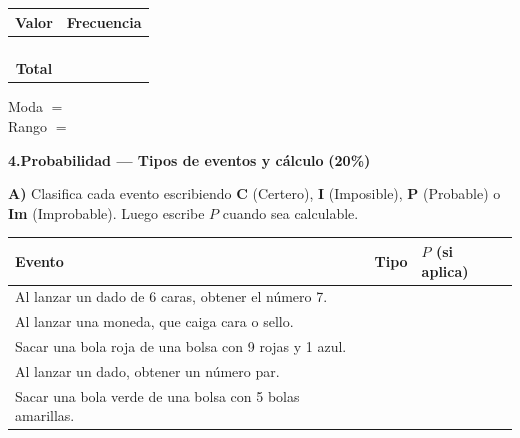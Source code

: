 \documentclass[12pt, letterpaper]{article}
\newcommand{\boxfill}[1][1.5cm]{\tcbox[on line, size=minimal,
	colframe=valdark!60, colback=boxbg, boxrule=0.8pt, arc=1mm,
	boxsep=3pt, left=2pt, right=2pt, top=2pt, bottom=2pt]%
	{\makebox[#1]{\vphantom{M}}}}
\begin{document}
	\begin{tcolorbox}[colback=white, colframe=valdark!40, boxrule=0.5pt, arc=1mm]
		\renewcommand{\arraystretch}{1.6}
		\begin{tabular}{|c|c|}
			\hline
			\rowcolor{boxbg}
			\textbf{Valor} & \textbf{Frecuencia} \\
			\hline
			\boxfill[2cm] & \boxfill[2cm] \\
			\hline
			\boxfill[2cm] & \boxfill[2cm] \\
			\hline
			\boxfill[2cm] & \boxfill[2cm] \\
			\hline
			\boxfill[2cm] & \boxfill[2cm] \\
			\hline
			\rowcolor{boxbg}\textbf{Total} & \boxfill[2cm] \\
			\hline
		\end{tabular}
		\hfill
		\begin{minipage}{0.38\textwidth}
			Moda $=$ \boxfill[2.5cm]\\[0.5cm]
			Rango $=$ \boxfill[2.5cm]
		\end{minipage}
	\end{tcolorbox}
	
	\newpage
	
	\noindent\textbf{4.\;Probabilidad — Tipos de eventos y cálculo}
	\hfill\textbf{(20\%)}
	
	\vspace{0.3cm}
	\textbf{A)} Clasifica cada evento escribiendo \textbf{C} (Certero),
	\textbf{I} (Imposible), \textbf{P} (Probable) o \textbf{Im} (Improbable).
	Luego escribe $P$ cuando sea calculable.
	
	\vspace{0.2cm}
	\renewcommand{\arraystretch}{1.8}
	\begin{center}
		\begin{tabular}{|m{9cm}|m{1.5cm}|m{2.5cm}|}
			\hline
			\rowcolor{valblue!20}
			\textbf{Evento} & \textbf{Tipo} & \textbf{$P$ (si aplica)} \\
			\hline
			Al lanzar un dado de 6 caras, obtener el número 7. &
			\boxfill[1.2cm] & \boxfill[2.2cm] \\
			\hline
			Al lanzar una moneda, que caiga cara o sello. &
			\boxfill[1.2cm] & \boxfill[2.2cm] \\
			\hline
			Sacar una bola roja de una bolsa con 9 rojas y 1 azul. &
			\boxfill[1.2cm] & \boxfill[2.2cm] \\
			\hline
			Al lanzar un dado, obtener un número par. &
			\boxfill[1.2cm] & \boxfill[2.2cm] \\
			\hline
			Sacar una bola verde de una bolsa con 5 bolas amarillas. &
			\boxfill[1.2cm] & \boxfill[2.2cm] \\
			\hline
		\end{tabular}
	\end{center}
	
\end{document}
